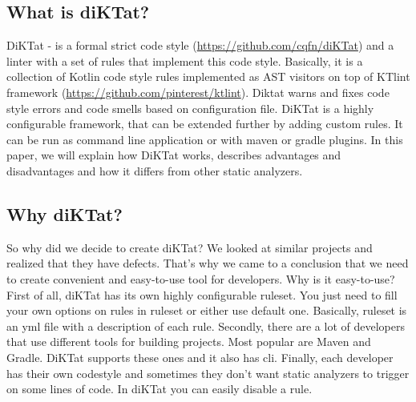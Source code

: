 \subsection{What is diKTat?}
DiKTat - is a formal strict code style (\url{https://github.com/cqfn/diKTat}) and a linter with a set of rules that implement this code style. Basically, it is a collection of Kotlin code style rules implemented as AST visitors on top of KTlint framework (\url{https://github.com/pinterest/ktlint}). Diktat warns and fixes code style errors and code smells based on configuration file. DiKTat is a highly configurable framework, that can be extended further by adding custom rules. It can be run as command line application or with maven or gradle plugins. In this paper, we will explain how DiKTat works, describes advantages and disadvantages and how it differs from other static analyzers.

\subsection{Why diKTat?}
So why did we decide to create diKTat? We looked at similar projects and realized that they have defects. That’s why we came to a conclusion that we need to create convenient and easy-to-use tool for developers. Why is it easy-to-use? First of all, diKTat has its own highly configurable ruleset. You just need to fill your own options on rules in ruleset or either use default one. Basically, ruleset is an yml file with a description of each rule. Secondly, there are a lot of developers that use different tools for building projects. Most popular are Maven and Gradle. DiKTat supports these ones and it also has cli. Finally, each developer has their own codestyle and sometimes they don’t want static analyzers to trigger on some lines of code. In diKTat you can easily disable a rule.